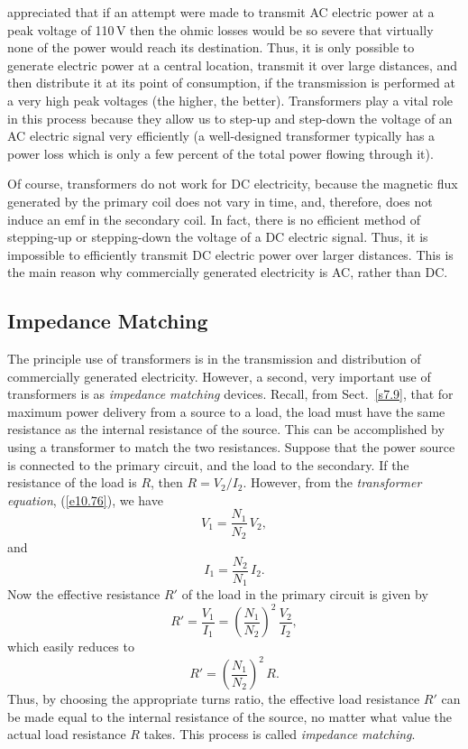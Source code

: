 appreciated that if an attempt were made to transmit AC electric power
at a peak voltage of 110\,V then the ohmic losses would be so severe that virtually none of
the power would reach its destination. Thus, it is only possible to generate
electric power at a central location, transmit it over large distances, 
and then distribute it at its point of consumption, if the transmission
is performed at a very high peak voltages (the higher, the better). Transformers
play a vital role in this process because they allow us to step-up
and step-down the voltage of an AC electric signal
 very efficiently (a well-designed
transformer typically has a  power loss which is only a few percent of the
total power  flowing through it). 

Of course, transformers do not work for DC electricity, because the
magnetic flux generated by the primary coil does not vary in time,
and, therefore, does not induce an emf in the secondary coil. 
In fact, there is no efficient method of stepping-up or
stepping-down the voltage of a DC electric signal. Thus, it is
impossible to efficiently transmit DC electric power over larger distances.
 This is the main reason why
commercially generated electricity is AC, rather than DC. 

\subsection{Impedance Matching}
The principle use of transformers is in
 the transmission and distribution of commercially generated electricity. 
However, a second, very important use of transformers is as {\em impedance matching}\/
devices. Recall, from Sect.~\ref{s7.9}, that for maximum
 power delivery from a source
to a load, the load must have the same resistance as the internal resistance
of the source. This can be accomplished by using a transformer to match the two
resistances. Suppose that the power source is connected to the primary
circuit, and the load to the secondary.
If the resistance of the load is $R$, then
$R= V_2/I_2$. However,  from the {\em transformer equation}, (\ref{e10.76}), we have
\begin{equation}
V_1 = \frac{N_1}{N_2}\,V_2,
\end{equation}
and
\begin{equation}
I_1 =\frac{N_2}{N_1}\,I_2.
\end{equation}
Now the effective resistance $R'$ of the load in the primary circuit
is given by
\begin{equation}
R' = \frac{V_1}{I_1} = \left(\frac{N_1}{N_2}\right)^2\,\frac{V_2}{I_2},
\end{equation}
which easily reduces to
\begin{equation}\label{e10.81}
R' = \left(\frac{N_1}{N_2}\right)^2\,R.
\end{equation}
Thus, by choosing the appropriate turns ratio, the effective load resistance 
$R'$ can be made equal to the internal resistance of the source, no matter what 
value the
actual load resistance $R$ takes. This process is called {\em impedance matching}.

